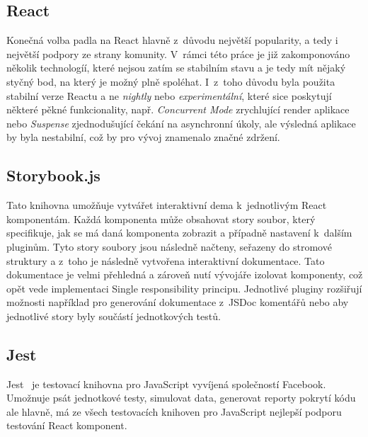 \subsection{React}
\label{ss:react}
Konečná volba padla na React hlavně z~důvodu největší popularity, a tedy i největší podpory ze strany komunity. V~rámci této práce je již zakomponováno několik technologíí, které nejsou zatím se stabilním stavu a je tedy mít nějaký styčný bod, na který je možný plně spoléhat. I~z~toho důvodu byla použita stabilní verze Reactu a ne \emph{nightly} nebo \emph{experimentální}, které sice poskytují některé pěkné funkcionality, např. \emph{Concurrent Mode} zrychlující render aplikace nebo \emph{Suspense} zjednodušující čekání na asynchronní úkoly, ale výsledná aplikace by byla nestabilní, což by pro vývoj znamenalo značné zdržení.


\subsection{Storybook.js}
\label{ss:storybook}
Tato knihovna umožňuje vytvářet interaktivní dema k~jednotlivým React komponentám. Každá komponenta může obsahovat story soubor, který specifikuje, jak se má daná komponenta zobrazit a případně nastavení k~dalším pluginům. Tyto story soubory jsou následně načteny, seřazeny do stromové struktury a z~toho je následně vytvořena interaktivní dokumentace. Tato dokumentace je velmi přehledná a zároveň nutí vývojáře izolovat komponenty, což opět vede implementaci Single responsibility principu. Jednotlivé pluginy rozšiřují možnosti například pro generování dokumentace z~JSDoc komentářů nebo aby jednotlivé story byly součástí jednotkových testů.

\subsection{Jest}
\label{ss:jest}
Jest~\cite{facebookinc_2017_jest} je testovací knihovna pro JavaScript vyvíjená společností Facebook. Umožnuje psát jednotkové testy, simulovat data, generovat reporty pokrytí kódu ale hlavně, má ze všech testovacích knihoven pro JavaScript nejlepší podporu testování React komponent.
